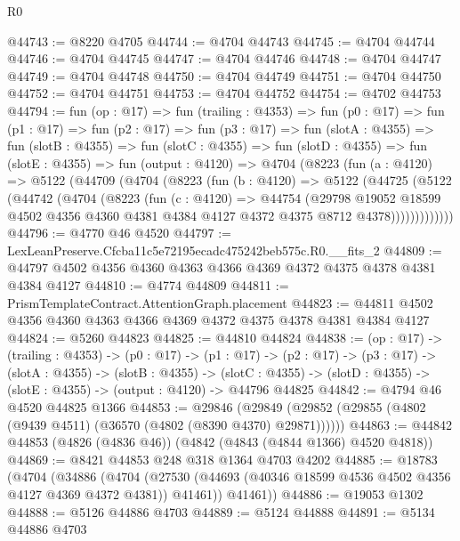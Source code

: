 \begin{lexlean}{R0}
\begin{coremodule}
@44743 := @8220 @4705
@44744 := @4704 @44743
@44745 := @4704 @44744
@44746 := @4704 @44745
@44747 := @4704 @44746
@44748 := @4704 @44747
@44749 := @4704 @44748
@44750 := @4704 @44749
@44751 := @4704 @44750
@44752 := @4704 @44751
@44753 := @4704 @44752
@44754 := @4702 @44753
@44794 := fun (op : @17) =>
  fun (trailing : @4353) =>
  fun (p0 : @17) =>
  fun (p1 : @17) =>
  fun (p2 : @17) =>
  fun (p3 : @17) =>
  fun (slotA : @4355) =>
  fun (slotB : @4355) =>
  fun (slotC : @4355) =>
  fun (slotD : @4355) =>
  fun (slotE : @4355) =>
  fun (output : @4120) =>
  @4704
    (@8223
      (fun (a : @4120) =>
      @5122
        (@44709
          (@4704
            (@8223
              (fun (b : @4120) =>
              @5122
                (@44725
                  (@5122
                    (@44742
                      (@4704
                        (@8223
                          (fun (c : @4120) =>
                          @44754
                            (@29798
                              @19052
                              @18599
                              @4502
                              @4356
                              @4360
                              @4381
                              @4384
                              @4127
                              @4372
                              @4375
                              @8712
                              @4378)))))))))))))
@44796 := @4770 @46 @4520
@44797 := LexLeanPreserve.Cfcba11c5e72195ecadc475242beb575c.R0.__fits_2
@44809 := @44797 @4502 @4356 @4360 @4363 @4366 @4369 @4372 @4375 @4378 @4381 @4384 @4127
@44810 := @4774 @44809
@44811 := PrismTemplateContract.AttentionGraph.placement
@44823 := @44811 @4502 @4356 @4360 @4363 @4366 @4369 @4372 @4375 @4378 @4381 @4384 @4127
@44824 := @5260 @44823
@44825 := @44810 @44824
@44838 := (op : @17) ->
  (trailing : @4353) ->
  (p0 : @17) ->
  (p1 : @17) ->
  (p2 : @17) ->
  (p3 : @17) ->
  (slotA : @4355) ->
  (slotB : @4355) ->
  (slotC : @4355) -> (slotD : @4355) -> (slotE : @4355) -> (output : @4120) -> @44796 @44825
@44842 := @4794 @46 @4520 @44825 @1366
@44853 := @29846
    (@29849 (@29852 (@29855 (@4802 (@9439 @4511) (@36570 (@4802 (@8390 @4370) @29871))))))
@44863 := @44842 @44853 (@4826 (@4836 @46)) (@4842 (@4843 (@4844 @1366) @4520 @4818))
@44869 := @8421 @44853 @248 @318 @1364 @4703 @4202
@44885 := @18783
    (@4704
      (@34886
        (@4704 (@27530 (@44693 (@40346 @18599 @4536 @4502 @4356 @4127 @4369 @4372 @4381)) @41461))
        @41461))
@44886 := @19053 @1302
@44888 := @5126 @44886 @4703
@44889 := @5124 @44888
@44891 := @5134 @44886 @4703

\end{coremodule}
\end{lexlean}
